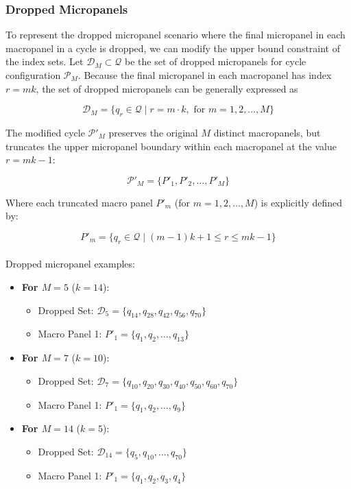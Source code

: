 \documentclass[
  number]{elsarticle}
\makeatletter
\let\oldparagraph\paragraph
\renewcommand{\paragraph}{
    \@ifstar
      \xxxParagraphStar
      \xxxParagraphNoStar
  }
\newcommand{\xxxParagraphStar}[1]{\oldparagraph*{#1}\mbox{}}
\newcommand{\xxxParagraphNoStar}[1]{\oldparagraph{#1}\mbox{}}
\providecommand{\tightlist}{%
  \setlength{\itemsep}{0pt}\setlength{\parskip}{0pt}}
\makeatother
\begin{document}
\subsubsection{Dropped Micropanels}\label{dropped-micropanels-1}

To represent the dropped micropanel scenario where the final micropanel
in each macropanel in a cycle is dropped, we can modify the upper bound
constraint of the index sets. Let \(\mathcal{D}_M \subset \mathcal{Q}\)
be the set of dropped micropanels for cycle configuration
\(\mathcal{P}_M\). Because the final micropanel in each macropanel has
index \(r = mk\), the set of dropped micropanels can be generally
expressed as

\[\mathcal{D}_M = \{ q_r \in \mathcal{Q} \mid r = m \cdot k, \text{ for } m = 1, 2, \dots, M \}\]

The modified cycle \(\mathcal{P}'_M\) preserves the original \(M\)
distinct macropanels, but truncates the upper micropanel boundary within
each macropanel at the value \(r = mk - 1\):

\[\mathcal{P}'_M = \{P'_1, P'_2, \dots, P'_M\}\]

Where each truncated macro panel \(P'_m\) (for \(m = 1, 2, \dots, M\))
is explicitly defined by:

\[P'_m = \{ q_r \in \mathcal{Q} \mid (m-1)k + 1 \leq r \leq mk - 1 \}\]

\paragraph{Dropped micropanel
examples:}\label{dropped-micropanel-examples}

\begin{itemize}
\tightlist
\item
  \textbf{For \(M = 5\)} (\(k = 14\)):

  \begin{itemize}
  \tightlist
  \item
    Dropped Set:
    \(\mathcal{D}_5 = \{q_{14}, q_{28}, q_{42}, q_{56}, q_{70}\}\)
  \item
    Macro Panel 1: \(P'_1 = \{q_1, q_2, \dots, q_{13}\}\)
  \end{itemize}
\item
  \textbf{For \(M = 7\)} (\(k = 10\)):

  \begin{itemize}
  \tightlist
  \item
    Dropped Set:
    \(\mathcal{D}_7 = \{q_{10}, q_{20}, q_{30}, q_{40}, q_{50}, q_{60}, q_{70}\}\)
  \item
    Macro Panel 1: \(P'_1 = \{q_1, q_2, \dots, q_{9}\}\)
  \end{itemize}
\item
  \textbf{For \(M = 14\)} (\(k = 5\)):

  \begin{itemize}
  \tightlist
  \item
    Dropped Set: \(\mathcal{D}_{14} = \{q_5, q_{10}, \dots, q_{70}\}\)
  \item
    Macro Panel 1: \(P'_1 = \{q_1, q_2, q_3, q_4\}\)
  \end{itemize}
\end{itemize}

\renewcommand{\bibsection}{}

\end{document}
